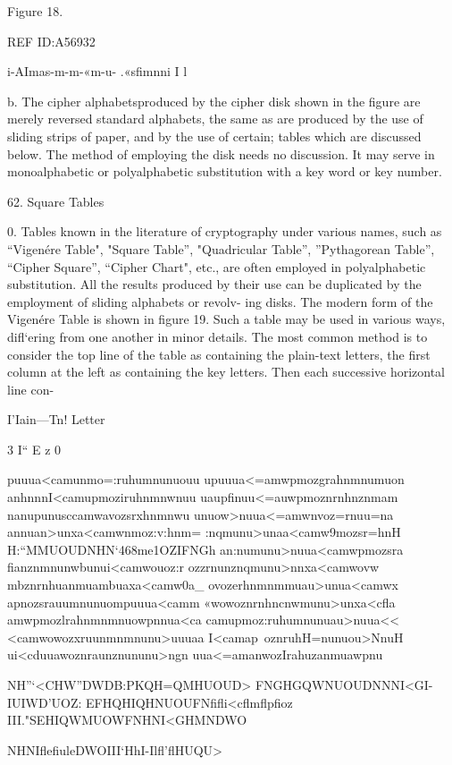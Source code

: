 {{{Figure 18.

 

 

 

REF ID:A56932

i-AImas-m-m-«m-u- .«sﬁmnni I l

b. The cipher alphabetsproduced by the cipher disk shown in the
ﬁgure are merely reversed standard alphabets, the same as are produced
by the use of sliding strips of paper, and by the use of certain; tables
which are discussed below. The method of employing the disk needs no
discussion. It may serve in monoalphabetic or polyalphabetic substitution
with a key word or key number.

62. Square Tables

0. Tables known in the literature of cryptography under various
names, such as “Vigenére Table", "Square Table”, "Quadricular Table”,
”Pythagorean Table”, “Cipher Square”, “Cipher Chart", etc., are often
employed in polyalphabetic substitution. All the results produced by their
use can be duplicated by the employment of sliding alphabets or revolv-
ing disks. The modern form of the Vigenére Table is shown in ﬁgure 19.
Such a table may be used in various ways, diﬂ‘ering from one another in
minor details. The most common method is to consider the top line of
the table as containing the plain-text letters, the ﬁrst column at the left
as containing the key letters. Then each successive horizontal line con-

I’Iain—Tn! Letter

3
I“
E
z
0

 

puuua<camunmo=:ruhumnunuouu
upuuua<=amwpmozgrahnmnumuon
anhnnnI<camupmoziruhnmnwnuu
uaupﬁnuu<=auwpmoznrnhnznmam
nanupunusccamwavozsrxhnmnwu
unuow>nuua<=amwnvoz=rnuu=na
annuan>unxa<camwnmoz:v:hnm=
:nqmunu>unaa<camw9mozsr=hnH
H:“MMUOUDNHN‘468me1OZIFNGh
an:numunu>nuua<camwpmozsra
ﬁanznmnunwbunui<camwouoz:r
ozzrnunznqmunu>nnxa<camwovw
mbznrnhuanmuambuaxa<camw0a_
ovozerhnmnmmuau>unua<camwx
apnozsrauumnunuompuuua<camm
«wowoznrnhncnwmunu>unxa<cﬂa
amwpmozlrahnmnmnuowpnnua<ca
camupmoz:ruhumnunuau>nuua<<
<camwowozxruunmnmnunu>uuuaa
I<camap~oznruhH=nunuou>NnuH
ui<cduuawoznraunznununu>ngn
uua<=amanwozIrahuzanmuawpnu

 

NH”‘<CHW”DWDB:PKQH=QMHUOUD>
FNGHGQWNUOUDNNNI<GI-IUIWD'UOZ:
EFHQHIQHNUOUFNﬁﬂi<cﬂmﬂpﬁoz
III."SEHIQWMUOWFNHNI<GHMNDWO

 

NHNIﬂeﬁuleDWOIII‘HhI-Ilﬂ'ﬂHUQU>

}}}
